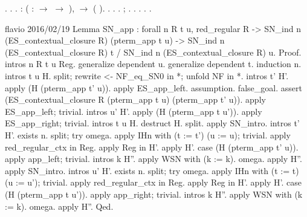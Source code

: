 \documentclass[12pt]{report}
\begin{document}
\begin{coqdoccode}
.  .\coqdoceol
\coqdocnoindent
{}.\coqdoceol
\coqdocemptyline
\coqdocnoindent
{} : \coqdockw{\ensuremath{\forall}} ( :  \ensuremath{\rightarrow}  \ensuremath{\rightarrow} ),\coqdoceol
\coqdocindent{1.00em}
  \ensuremath{\rightarrow}  ( ).\coqdoceol
\coqdocnoindent
{}.\coqdoceol
\coqdocindent{1.00em}
.  .\coqdoceol
\coqdocindent{1.00em}
 ; . .\coqdoceol
\coqdocindent{1.00em}
 .  .\coqdoceol
\coqdocnoindent
{}.\coqdoceol
\coqdocemptyline
\end{coqdoccode}
flavio 2016/02/19
Lemma SN\_app : forall n R t u, red\_regular R ->  
               SN\_ind n (ES\_contextual\_closure R) (pterm\_app t u) ->
               SN\_ind n (ES\_contextual\_closure R) t / SN\_ind n (ES\_contextual\_closure R) u.
Proof.
 intros n R t u Reg. 
 generalize dependent u.
 generalize dependent t.
 induction n.  intros t u H. split; rewrite <- NF\_eq\_SN0 in *; unfold NF in *. 
 intros t' H'. apply (H (pterm\_app t' u)).
 apply ES\_app\_left. assumption.
 false\_goal.
 assert (ES\_contextual\_closure R (pterm\_app t u) (pterm\_app t' u)).
 apply ES\_app\_left; trivial. 
 intros u' H'. apply (H (pterm\_app t u')). apply ES\_app\_right; trivial.
 intros t u H. destruct H. split. 
 apply SN\_intro. intros t' H'. exists n. split; try omega. 
 apply IHn with (t := t') (u := u); trivial. apply red\_regular\_ctx in Reg.
 apply Reg in H'. apply H'. case (H (pterm\_app t' u)). apply app\_left; trivial. 
 intros k H''. apply WSN with (k := k). omega. apply H''.
 apply SN\_intro. intros u' H'. exists n. split; try omega. 
 apply IHn with (t := t) (u := u'); trivial. apply red\_regular\_ctx in Reg.
 apply Reg in H'. apply H'. case (H (pterm\_app t u')). apply app\_right; trivial. 
 intros k H''. apply WSN with (k := k). omega. apply H''.
Qed. 
\end{document}
